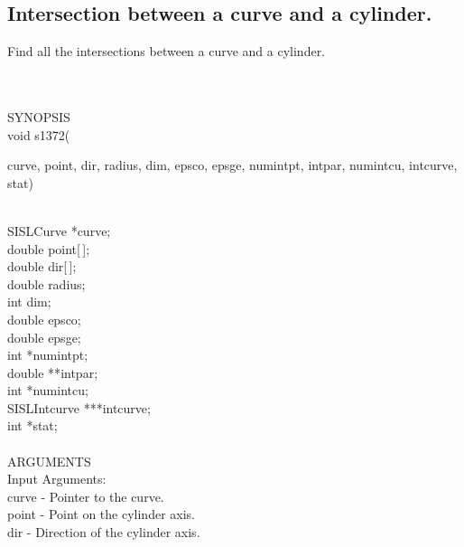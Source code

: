 \subsection{Intersection between a curve and a cylinder.}
\begin{minipg1}
  Find all the intersections between a curve and a cylinder.

\end{minipg1} \\ \\
SYNOPSIS\\
        \>void s1372(\begin{minipg3}
        {\fov curve}, {\fov point}, {\fov dir}, {\fov radius}, {\fov dim}, {\fov epsco}, {\fov epsge}, {\fov numintpt}, {\fov intpar},
                        {\fov numintcu}, {\fov intcurve}, {\fov stat})
                \end{minipg3}\\[0.3ex]
                \>\>    SISLCurve       \>      *{\fov curve};\\
                \>\>    double  \>      {\fov point}[\,];\\
                \>\>    double  \>      {\fov dir}[\,];\\
                \>\>    double  \>      {\fov radius};\\
                \>\>    int     \>      {\fov dim};\\
                \>\>    double  \>      {\fov epsco};\\
                \>\>    double  \>      {\fov epsge};\\
                \>\>    int     \>      *{\fov numintpt};\\
                \>\>    double  \>      **{\fov intpar};\\
                \>\>    int     \>      *{\fov numintcu};\\
                \>\>    SISLIntcurve \> ***{\fov intcurve};\\
                \>\>    int     \>      *{\fov stat};\\
\\
ARGUMENTS\\
        \>Input Arguments:\\
        \>\>    {\fov curve}    \> - \> Pointer to the curve.\\
        \>\>    {\fov point}    \> - \> Point on the cylinder axis.\\
        \>\>    {\fov dir}      \> - \> Direction of the cylinder axis.\\
